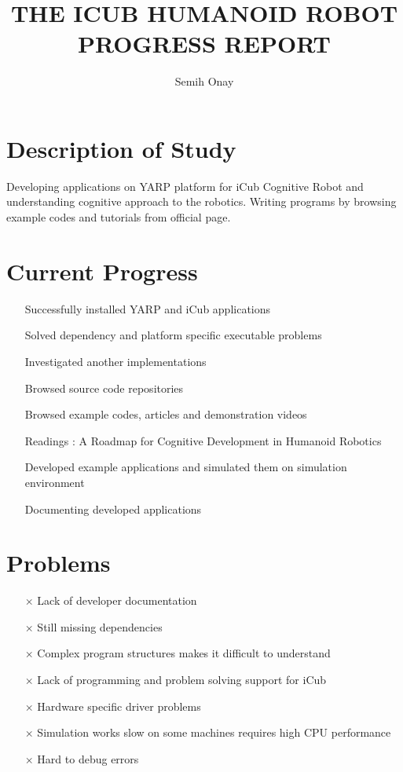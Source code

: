 \documentclass[12pt]{report}
\title{THE ICUB HUMANOID ROBOT \\ PROGRESS REPORT}
\author{Semih Onay}
\begin{document}
\makecstitle

\chapter*{Description of Study}
Developing applications on YARP platform for iCub Cognitive Robot and understanding 
cognitive approach to the robotics. Writing programs by browsing example codes and tutorials from official page.

\chapter*{Current Progress}
\begin{itemize}
\item[\checkmark] Successfully installed YARP and iCub  applications
\item[\checkmark]Solved dependency and platform specific executable problems
\item[\checkmark]Investigated another implementations
\item[\checkmark]Browsed source code repositories
\item[\checkmark]Browsed example codes, articles and demonstration videos
\item[\checkmark]Readings : A Roadmap for Cognitive Development in Humanoid Robotics
\item[\checkmark]Developed example applications and simulated them on simulation environment
\item[\checkmark]Documenting developed applications
\end{itemize}

\chapter*{Problems}
\begin{itemize}
\item[$\times$]Lack of developer documentation
\item[$\times$]Still missing dependencies
\item[$\times$]Complex program structures makes it difficult to understand
\item[$\times$]Lack of programming and problem solving support for iCub
\item[$\times$]Hardware specific driver problems
\item[$\times$]Simulation works slow on some machines requires high CPU performance
\item[$\times$]Hard to debug errors
\end{itemize}
\end{document}
